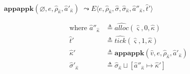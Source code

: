 \documentclass[12pt,draft]{article}
\begin{document}
\begin{multicols*}{2}
\begin{align*}
\end{align*}
\begin{center}
  $\textbf{appappk}(\varnothing, e, \hat{\rho}_{\hat{\kappa}}, \hat{a}'_{\hat{\kappa}})$
  $\leadsto E\langle e , \hat{\rho}_{\hat{\kappa}} , \hat{\sigma} , \hat{\sigma}_{\hat{\kappa}} , \hat{a}''_{\hat{\kappa}} , \hat{t}'\rangle$
\end{center}
\vspace{-7mm}
\begin{align*}
  \text{where }
  \hat{a}''_{\hat{\kappa}} &\triangleq \widehat{alloc}(\hat{\varsigma}, 0, \hat{\kappa}) \\
  \hat{t}' &\triangleq \widehat{tick}(\hat{\varsigma}, 1, \hat{\kappa}) \\
  \hat{\kappa}' &\triangleq \textbf{appappk}(\hat{v}, e, \hat{\rho}_{\hat{\kappa}}, \hat{a}'_{\hat{\kappa}}) \\
  \hat{\sigma}'_{\hat{\kappa}} &\triangleq \hat{\sigma}_{\hat{\kappa}} \sqcup [\hat{a}''_{\hat{\kappa}} \mapsto \hat{\kappa}']
\end{align*}

\vfill\null
\columnbreak



\end{multicols*}
\end{document}
